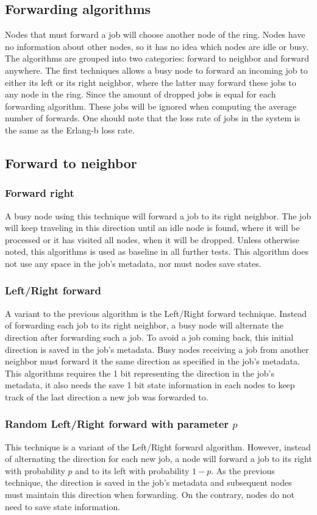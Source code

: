 \documentclass[10pt,a4paper]{article}
\begin{document}
\subsection{Forwarding algorithms}
Nodes that must forward a job will choose another node of the ring. Nodes have no information about other nodes, so it has no idea which nodes are idle or busy. The algorithms are grouped into two categories: forward to neighbor and forward anywhere.
The first techniques allows a busy node to forward an incoming job to either its left or its right neighbor, where the latter may forward these jobs to any node in the ring. 
Since the amount of dropped jobs is equal for each forwarding algorithm. These jobs will be ignored when computing the average number of forwards. One should note that the loss rate of jobs in the system is the same as the Erlang-b loss rate.

\subsection{Forward to neighbor}
\subsubsection*{Forward right}
A busy node using this technique will forward a job to its right neighbor. The job will keep traveling in this direction until an idle node is found, where it will be processed or it has visited all nodes, when it will be dropped. Unless otherwise noted, this algorithms is used as baseline in all further tests. This algorithm does not use any space in the job's metadata, nor must nodes save states.

\subsubsection*{Left/Right forward}
A variant to the previous algorithm is the Left/Right forward technique. Instead of forwarding each job to its right neighbor, a busy node will alternate the direction after forwarding such a job. To avoid a job coming back, this initial direction is saved in the job's metadata. Busy nodes receiving a job from another neighbor must forward it the same direction as specified in the job's metadata. This algorithms requires the 1 bit representing the direction in the job's metadata, it also needs the save 1 bit state information in each nodes to keep track of the last direction a new job was forwarded to.

\subsubsection*{Random Left/Right forward with parameter $p$}
This technique is a variant of the Left/Right forward algorithm. However, instead of alternating the direction for each new job, a node will forward a job to its right with probability $p$ and to its left with probability $1-p$. As the previous technique, the direction is saved in the job's metadata and subsequent nodes must maintain this direction when forwarding. On the contrary, nodes do not need to save state information.
\end{document}
